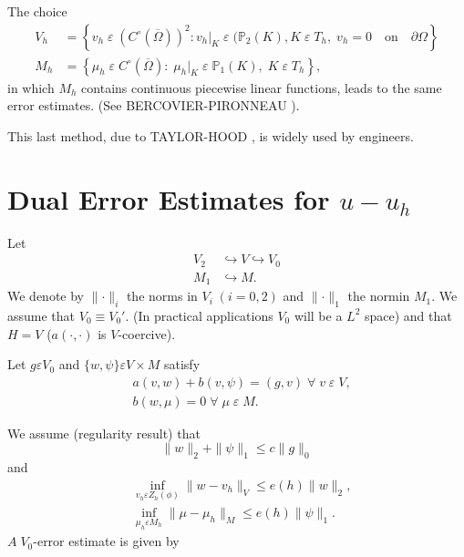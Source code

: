 The choice 
\begin{align*}
V_h &= \left\{v_h\;\varepsilon \;(C^\circ(\overline{\Omega}))^2:v_h|_K\;
\varepsilon \;(\mathbb{P}_2(K),K\;\varepsilon \;T_h,\;v_h=0\quad
\text{on}\quad\partial\Omega\right\}\\
M_h &= \left\{\mu_h\;\varepsilon \;C^\circ(\overline{\Omega}):\;\mu_h|_K
\;\varepsilon \;\mathbb{P}_1(K),\;K\;\varepsilon \;T_h\right\},
\end{align*}
in which $M_h$ contains continuous piecewise linear functions, leads
to the same error estimates. (See BERCOVIER-PIRONNEAU \cite{key3}). 

This last method, due to TAYLOR-HOOD \cite{key42}, is widely used by
engineers.

\section{Dual Error Estimates for $u-u_h$} \label{chap7:ssec7.4} 
Let 
\begin{align*}
V_2 &\hookrightarrow V\hookrightarrow V_0\\
M_1 &\hookrightarrow M.
\end{align*}
We denote by $\parallel\cdotp\parallel_i$ the norms in $V_i\;(i=0, 2)$
and $\parallel\cdotp\parallel_1$ the norm\pageoriginale in $M_1$. We
assume that $V_0\equiv V_0'$. (In practical applications $V_0$ will be
a $L^2$ space) and that $H=V$ (\ie $a(\cdotp,\cdotp)$ is
$V$-coercive).

Let $g\varepsilon V_0$ and $\{w,\psi\}\varepsilon V\times M$ satisfy
\begin{align*}
& a(v,w)+b(v,\psi)=(g,v)\;\forall\;v\;\varepsilon
\;V,\tag{7.21} \label{chap7:eq7.21}\\ 
& b(w,\mu)=0\;\forall\;\mu\;\varepsilon \;M.\tag{7.21b} \label{chap7:eq7.21b}
\end{align*}

We assume (regularity result) that 
\setcounter{equation}{21}
\begin{equation}\label{chap7:eq7.22}
\parallel w\parallel_2+\parallel \psi\parallel_1\leq c\parallel g\parallel_0
\end{equation}
and
\begin{align}
&\inf\limits_{v_h\varepsilon Z_h(\phi)}\parallel w-v_h\parallel_V\leq
e(h)\parallel w\parallel_2,\label{chap7:eq7.23}\\
&\inf\limits_{\mu_h\varepsilon M_h}\parallel\mu-\mu_h\parallel_M\leq
e(h)\parallel\psi\parallel_1. \label{chap7:eq7.24}
\end{align}
$A\;V_0$-error estimate is given by 

